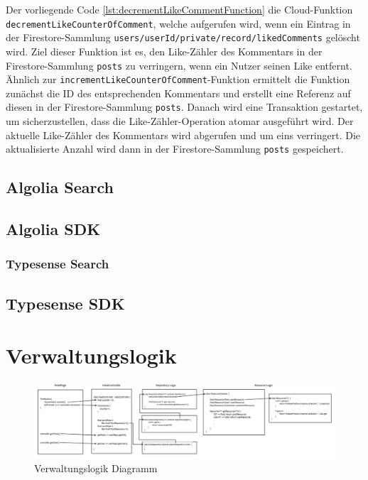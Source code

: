 Der vorliegende Code \ref{lst:decrementLikeCommentFunction} die Cloud-Funktion \texttt{decrementLikeCounterOfComment}, welche aufgerufen wird, wenn ein Eintrag in der Firestore-Sammlung \texttt{users/{userId}/private/record/likedComments} gelöscht wird. Ziel dieser Funktion ist es, den Like-Zähler des Kommentars in der Firestore-Sammlung \texttt{posts} zu verringern, wenn ein Nutzer seinen Like entfernt. Ähnlich zur \texttt{incrementLikeCounterOfComment}-Funktion ermittelt die Funktion zunächst die ID des entsprechenden Kommentars und erstellt eine Referenz auf diesen in der Firestore-Sammlung \texttt{posts}. Danach wird eine Transaktion gestartet, um sicherzustellen, dass die Like-Zähler-Operation atomar ausgeführt wird. Der aktuelle Like-Zähler des Kommentars wird abgerufen und um eins verringert. Die aktualisierte Anzahl wird dann in der Firestore-Sammlung \texttt{posts} gespeichert.

\subsection{Algolia Search}
\subsection{Algolia SDK}

\subsubsection{Typesense Search}
\subsection{Typesense SDK}

\section{Verwaltungslogik}

\begin{figure}[h]
  \centering
  \includegraphics[width=1\textwidth]{pics/Repository-Resource-Diagram.jpg}
  \caption{Verwaltungslogik Diagramm}
\end{figure}

